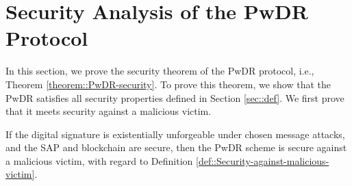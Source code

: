 
\section{Security Analysis of the PwDR Protocol}\label{sec::proof}

In this section, we prove the security theorem of the PwDR protocol, i.e., Theorem \ref{theorem::PwDR-security}. %
%
To prove this theorem, we show that the PwDR satisfies all security properties defined in Section \ref{sec::def}. We first prove that it meets security against a malicious victim. 


\begin{lemma}\label{lemma::secure-against-a-malicious-victim} If the digital signature is existentially unforgeable under chosen message attacks, and the SAP and blockchain are secure, then the PwDR scheme is secure against a malicious victim, with regard to Definition \ref{def::Security-against-malicious-victim}. 
\end{lemma}

